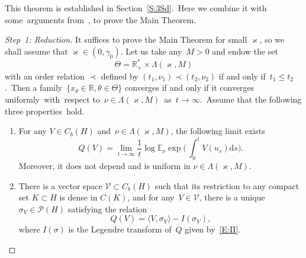\documentclass[AHL,Unicode,longabstracts]{cedram}
\newcommand{\R}{{\mathbb R}}
\newcommand{\E}{{\mathbb E}}
\newcommand{\PP}{{\mathcal P}}
\newcommand{\VV}{{\mathcal V}}
\newcommand{\vk}{{\varkappa}}
\newcommand{\ty}{\infty}
\newcommand{\lag}{\langle}
\newcommand{\rag}{\rangle}
\newcommand{\dd}{\mathrm{d}}
\newenvironment{step}{\begin{proof}}{\let\qed\relax \end{proof}}
\begin{document}
This theorem is established in Section~\ref{S:3Sd}.~Here we combine it with some~arguments from~\cite{JNPS-2014, MN-2015}, to prove the Main Theorem.

\begin{proofc}

\begin{step}[Step~1: Reduction]
It suffices to prove the Main Theorem for small $\vk$, so we shall assume that $\vk\in (0, \gamma_0)$.
Let us take any~$M>0$ and endow the set
\[
\Theta= \R^*_+\times\Lambda(\vk,M)
\]
with an order relation $\prec$ defined by $(t_1,\nu_1)\prec (t_2,\nu_2)$ if and only if~$t_1\le t_2$.~Then a family~$\{x_\theta\in \R,\theta\in\Theta\}$ converges if and only if it converges uniformly~with~respect to~$\nu\in\Lambda(\vk,M)$~as~$t\to\ty$.~Assume that the following three properties~hold.
\begin{enumerate}
\item \label{prop1} For any $V\in C_b(H)$ and~$\nu\in \Lambda(\vk,M)$, the following limit exists
\[
Q(V)=\lim_{t\to\ty} \frac{1}{t}
\log \E_\nu \exp \biggl(\,\int_0^tV(u_s)\dd s\biggr).
\]
Moreover, it does not depend and is uniform in $\nu\in \Lambda(\vk,M)$.

\item \label{prop2} There is a vector space $\VV\subset C_b(H)$ such that its restriction to any compact set $K\subset H$ is dense in $C(K)$, and for any~$V\in \VV $, there is a unique~$\sigma_V\in \PP(H)$ satisfying the relation
\begin{equation}\label{equilhdd}
Q(V)= \lag V, \sigma_V\rag-I(\sigma_V),
\end{equation}
where $I(\sigma)$ is the Legendre transform of~$Q$ given by~\eqref{E:II}.


\end{enumerate}
\end{step}
\end{proofc}
\end{document}
